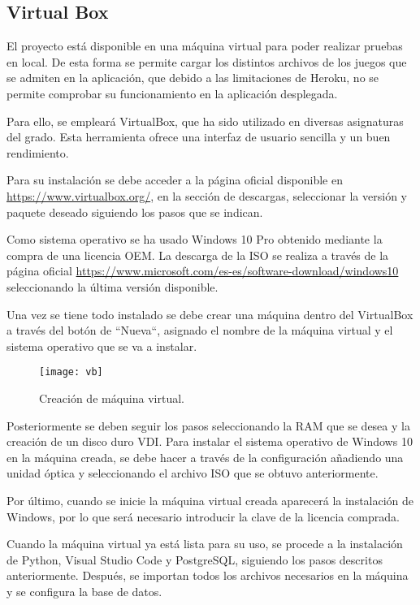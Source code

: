 \subsection{Virtual Box}
El proyecto está disponible en una máquina virtual para poder realizar pruebas en local. De esta forma se permite cargar los distintos archivos de los juegos que se admiten en la aplicación, que debido a las limitaciones de Heroku, no se permite comprobar su funcionamiento en la aplicación desplegada.

Para ello, se empleará VirtualBox, que ha sido utilizado en diversas asignaturas del grado. Esta herramienta ofrece una interfaz de usuario sencilla y un buen rendimiento.

Para su instalación se debe acceder a la página oficial disponible en \url{https://www.virtualbox.org/}, en la sección de descargas,  seleccionar la versión y paquete deseado siguiendo los pasos que se indican.

Como sistema operativo se ha usado Windows 10 Pro obtenido mediante la compra de una licencia OEM. La descarga de la ISO se realiza a través de la página oficial \url{https://www.microsoft.com/es-es/software-download/windows10} seleccionando la última versión disponible.

Una vez se tiene todo instalado se debe crear una máquina dentro del VirtualBox a través del botón de ``Nueva``, asignado el nombre de la máquina virtual y el sistema operativo que se va a instalar.
    \begin{figure}[htbp]
    \centering
    \texttt{[image: vb]}
    \caption{Creación de máquina virtual.}
    \label{fig:vb}
    \end{figure}
    
Posteriormente se deben seguir los pasos seleccionando la RAM que se desea y la creación de un disco duro VDI. Para instalar el sistema operativo de Windows 10 en la máquina creada, se debe hacer a través de la configuración añadiendo una unidad óptica y seleccionando el archivo ISO que se obtuvo anteriormente.

Por último, cuando se inicie la máquina virtual creada aparecerá la instalación de Windows, por lo que será necesario introducir la clave de la licencia comprada.

Cuando la máquina virtual ya está lista para su uso, se procede a la instalación de Python, Visual Studio Code y PostgreSQL, siguiendo los pasos descritos anteriormente. Después, se importan todos los archivos necesarios en la máquina y se configura la base de datos.

